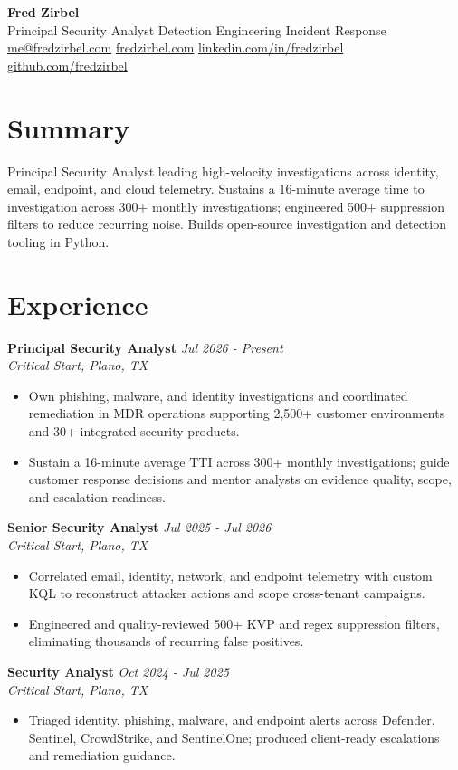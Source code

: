 \documentclass[10pt,letterpaper]{article}
\newcommand{\role}[3]{\textbf{#1} \hfill \textit{#2}\\[-1pt]\textit{#3}}
\begin{document}
{\Huge\bfseries Fred Zirbel}\\[2pt]
{\large Principal Security Analyst \textbar{} Detection Engineering \textbar{} Incident Response}\\[3pt]
\href{mailto:me@fredzirbel.com}{me@fredzirbel.com} \quad
\href{https://fredzirbel.com}{fredzirbel.com} \quad
\href{https://www.linkedin.com/in/fredzirbel}{linkedin.com/in/fredzirbel} \quad
\href{https://github.com/fredzirbel}{github.com/fredzirbel}

\section*{Summary}
Principal Security Analyst leading high-velocity investigations across identity, email, endpoint, and cloud telemetry. Sustains a 16-minute average time to investigation across 300+ monthly investigations; engineered 500+ suppression filters to reduce recurring noise. Builds open-source investigation and detection tooling in Python.

\section*{Experience}
\role{Principal Security Analyst}{Jul 2026 - Present}{Critical Start, Plano, TX}
\begin{itemize}
  \item Own phishing, malware, and identity investigations and coordinated remediation in MDR operations supporting 2,500+ customer environments and 30+ integrated security products.
  \item Sustain a 16-minute average TTI across 300+ monthly investigations; guide customer response decisions and mentor analysts on evidence quality, scope, and escalation readiness.
\end{itemize}
\role{Senior Security Analyst}{Jul 2025 - Jul 2026}{Critical Start, Plano, TX}
\begin{itemize}
  \item Correlated email, identity, network, and endpoint telemetry with custom KQL to reconstruct attacker actions and scope cross-tenant campaigns.
  \item Engineered and quality-reviewed 500+ KVP and regex suppression filters, eliminating thousands of recurring false positives.
\end{itemize}
\role{Security Analyst}{Oct 2024 - Jul 2025}{Critical Start, Plano, TX}
\begin{itemize}
  \item Triaged identity, phishing, malware, and endpoint alerts across Defender, Sentinel, CrowdStrike, and SentinelOne; produced client-ready escalations and remediation guidance.
\end{itemize}
\end{document}
